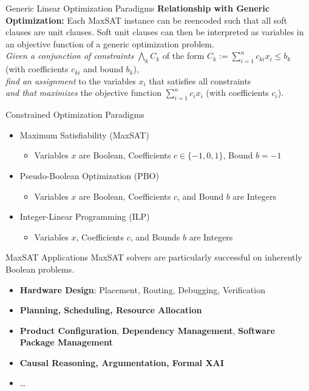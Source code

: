 \documentclass[t,english]{sdqbeamer}
\begin{document}
\begin{frame}{Generic Linear Optimization Paradigms}
\vspace{-2em}
\textbf{Relationship with Generic Optimization:} Each MaxSAT instance can be reencoded such that all soft clauses are unit clauses. Soft unit clauses can then be interpreted as variables in an objective function of a generic optimization problem.~\\[1em]
\emph{Given a conjunction of constraints} $\bigwedge_k C_k$ of the form $C_k := \sum\limits_{i=1}^n c_{ki} x_i \leq b_k$ (with coefficients $c_{ki}$ and bound $b_k$),\\
\emph{find an assignment} to the variables $x_i$ that satisfies all constraints\\
\emph{and that maximizes} the objective function $\sum\limits_{i=1}^n c_i x_i$ (with coefficients $c_i$).~\\[1em]
\begin{block}{Constrained Optimization Paradigms}
\begin{itemize}\itemsep2em
	\item Maximum Satisfiability (MaxSAT)
	\begin{itemize}\itemsep1ex
		\item Variables $x$ are Boolean, Coefficients $c \in \{-1, 0, 1\}$, Bound $b=-1$
	\end{itemize}
	\item Pseudo-Boolean Optimization (PBO)
	\begin{itemize}\itemsep1ex
		\item Variables $x$ are Boolean, Coefficients $c$, and Bound $b$ are Integers
	\end{itemize}
	\item Integer-Linear Programming (ILP)
	\begin{itemize}\itemsep1ex
		\item Variables $x$, Coefficients $c$, and Bounds $b$ are Integers
	\end{itemize}
\end{itemize}
\end{block}
\end{frame}

\begin{frame}{MaxSAT Applications}
MaxSAT solvers are particularly successful on inherently Boolean problems.\\[1em]
\begin{itemize}\itemsep1em
	\item \textbf{Hardware Design}: Placement, Routing, Debugging, Verification
	\item \textbf{Planning, Scheduling, Resource Allocation}
	\item \textbf{Product Configuration}, \textbf{Dependency Management}, \textbf{Software Package Management}
	\item \textbf{Causal Reasoning, Argumentation, Formal XAI}
  	\item \dots 
\end{itemize}
\end{frame}
\end{document}
